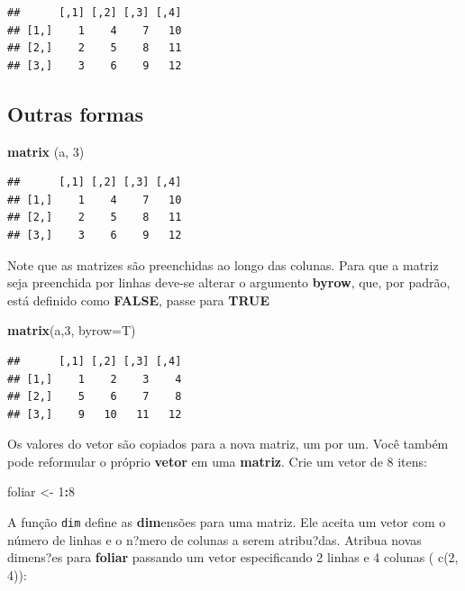 \documentclass[]{book}
\newenvironment{Shaded}{\begin{snugshade}}{\end{snugshade}}
\newcommand{\DataTypeTok}[1]{\textcolor[rgb]{0.13,0.29,0.53}{#1}}
\newcommand{\DecValTok}[1]{\textcolor[rgb]{0.00,0.00,0.81}{#1}}
\newcommand{\KeywordTok}[1]{\textcolor[rgb]{0.13,0.29,0.53}{\textbf{#1}}}
\newcommand{\NormalTok}[1]{#1}
\newcommand{\OperatorTok}[1]{\textcolor[rgb]{0.81,0.36,0.00}{\textbf{#1}}}
\newcommand{\StringTok}[1]{\textcolor[rgb]{0.31,0.60,0.02}{#1}}
\begin{document}
\begin{verbatim}
##      [,1] [,2] [,3] [,4]
## [1,]    1    4    7   10
## [2,]    2    5    8   11
## [3,]    3    6    9   12
\end{verbatim}

\hypertarget{outras-formas}{%
\subsection{Outras formas}\label{outras-formas}}

\begin{Shaded}
\begin{Highlighting}[]
\KeywordTok{matrix}\NormalTok{ (a, }\DecValTok{3}\NormalTok{)}
\end{Highlighting}
\end{Shaded}

\begin{verbatim}
##      [,1] [,2] [,3] [,4]
## [1,]    1    4    7   10
## [2,]    2    5    8   11
## [3,]    3    6    9   12
\end{verbatim}

Note que as matrizes são preenchidas ao longo das colunas. Para que a matriz seja preenchida por linhas deve-se alterar o argumento \textbf{byrow}, que, por padrão, está definido como \textbf{FALSE}, passe para \textbf{TRUE}

\begin{Shaded}
\begin{Highlighting}[]
\KeywordTok{matrix}\NormalTok{(a,}\DecValTok{3}\NormalTok{, }\DataTypeTok{byrow=}\NormalTok{T)}
\end{Highlighting}
\end{Shaded}

\begin{verbatim}
##      [,1] [,2] [,3] [,4]
## [1,]    1    2    3    4
## [2,]    5    6    7    8
## [3,]    9   10   11   12
\end{verbatim}

Os valores do vetor são copiados para a nova matriz, um por um. Você também pode reformular o próprio \textbf{vetor} em uma \textbf{matriz}. Crie um vetor de 8 itens:

\begin{Shaded}
\begin{Highlighting}[]
\NormalTok{foliar <-}\StringTok{ }\DecValTok{1}\OperatorTok{:}\DecValTok{8}
\end{Highlighting}
\end{Shaded}

A função \texttt{dim} define as \textbf{dim}ensões para uma matriz. Ele aceita um vetor com o número de linhas e o n?mero de colunas a serem atribu?das.
Atribua novas dimens?es para \textbf{foliar} passando um vetor especificando 2 linhas e 4 colunas ( c(2, 4)):
\end{document}
